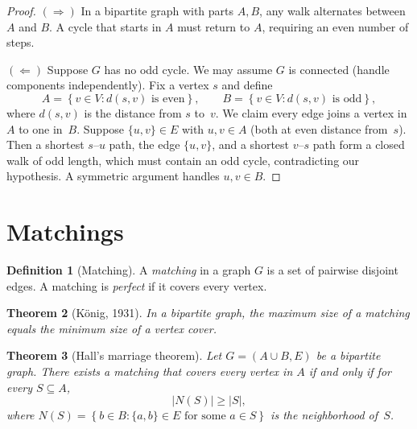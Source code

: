 \documentclass[12pt,a4paper,openany]{book}
\theoremstyle{definition}
\newtheorem{definition}{Definition}[chapter]
\theoremstyle{plain}
\newtheorem{theorem}[definition]{Theorem}
\theoremstyle{remark}
\newcommand{\abs}[1]{\left|#1\right|}
\newcommand{\set}[1]{\left\{#1\right\}}
\begin{document}
\begin{proof}
$(\Rightarrow)$\; In a bipartite graph with parts $A,B$, any walk
alternates between $A$ and $B$.  A cycle that starts in $A$ must return
to $A$, requiring an even number of steps.

$(\Leftarrow)$\; Suppose $G$ has no odd cycle.  We may assume $G$ is
connected (handle components independently).  Fix a vertex $s$ and
define
\[
  A=\set{v\in V : d(s,v)\text{ is even}},\qquad
  B=\set{v\in V : d(s,v)\text{ is odd}},
\]
where $d(s,v)$ is the distance from $s$ to~$v$.  We claim every edge
joins a vertex in $A$ to one in~$B$.  Suppose $\{u,v\}\in E$ with
$u,v\in A$ (both at even distance from~$s$).  Then a shortest $s$--$u$
path, the edge $\{u,v\}$, and a shortest $v$--$s$ path form a closed
walk of odd length, which must contain an odd cycle, contradicting
our hypothesis.  A symmetric argument handles $u,v\in B$.
\end{proof}

\section{Matchings}
\label{sec:matching}

\begin{definition}[Matching]
\label{def:matching}
A \emph{matching} in a graph $G$ is a set of pairwise disjoint edges.
A matching is \emph{perfect} if it covers every vertex.
\end{definition}

\begin{theorem}[K\"onig, 1931]
\label{thm:konig}
In a bipartite graph, the maximum size of a matching equals the minimum
size of a vertex cover.
\end{theorem}

\begin{theorem}[Hall's marriage theorem]
\label{thm:hall}
Let $G=(A\cup B,E)$ be a bipartite graph.  There exists a matching that
covers every vertex in $A$ if and only if for every $S\subseteq A$,
\[
  \abs{N(S)}\ge\abs{S},
\]
where $N(S)=\set{b\in B:\{a,b\}\in E\text{ for some }a\in S}$ is the
neighborhood of~$S$.
\end{theorem}
\end{document}
